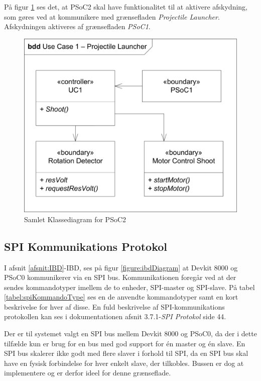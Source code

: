 \noindent På figur \ref{fig:CompleteClassDiagramPSoC2} ses det, at PSoC2 skal have funktionalitet til at aktivere afskydning, som gøres ved at kommunikere med grænsefladen \textit{Projectile Launcher}. Afskydningen aktiveres af grænsefladen \textit{PSoC1}.
\begin{figure}[H]
	\centering
	\includegraphics[width=\textwidth] {Systemarkitektur/images/affyringKlassediagram.png}
	\caption{Samlet Klassediagram for PSoC2}
	\label{fig:CompleteClassDiagramPSoC2}
\end{figure}

\subsection{SPI Kommunikations Protokol}
I afsnit \ref{afsnit:IBD}-IBD, ses på figur \ref{figure:ibdDiagram} at Devkit 8000 og PSoC0 kommunikerer via en SPI bus. Kommunikationen foregår ved at der sendes kommandotyper imellem de to enheder, SPI-master og SPI-slave. På tabel \ref{tabel:spiKommandoType} ses en de anvendte kommandotyper samt en kort beskrivelse for hver af disse. En fuld beskrivelse af SPI-kommunikations protokollen kan ses i dokumentationen afsnit 3.7.1-\textit{SPI Protokol} side 44.\newline

\noindent Der er til systemet valgt en SPI bus mellem Devkit 8000 og PSoC0, da der i dette tilfælde kun er brug for en bus med god support for én master og én slave. En SPI bus skalerer ikke godt med flere slaver i forhold til SPI, da en SPI bus skal have en fysisk forbindelse for hver enkelt slave, der tilkobles. Bussen er dog at implementere og er derfor ideel for denne grænseflade.


